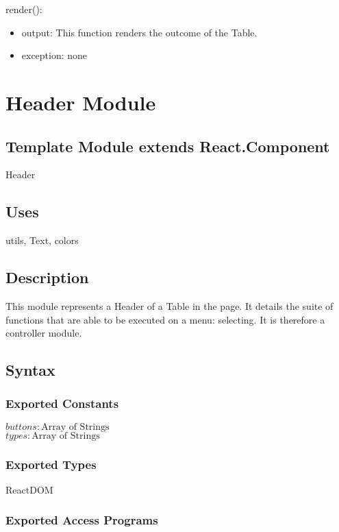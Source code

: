 \documentclass[12pt, titlepage]{article}
\begin{document}
\noindent render():
\begin{itemize}
\item output: This function renders the outcome of the Table.
\item exception: none
\end{itemize}

\newpage

\section{Header Module}

\subsection{Template Module extends React.Component}

Header

\subsection{Uses}

utils, Text, colors

\subsection{Description}
This module represents a Header of a Table in the page. It details the suite of functions that are able to be executed on a menu: selecting. It is therefore a controller module.

\subsection{Syntax}

\subsubsection{Exported Constants}

$\mathit{buttons}: \text{Array of Strings}$\\
$\mathit{types}: \text{Array of Strings}$\\

\subsubsection{Exported Types}

ReactDOM

\subsubsection{Exported Access Programs}
\end{document}

